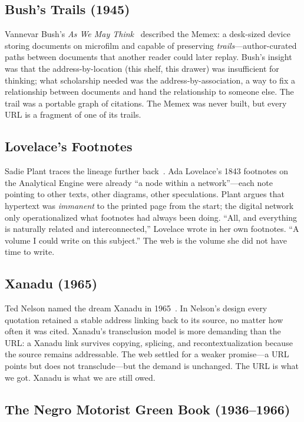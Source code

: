 \documentclass[10pt,letterpaper,twocolumn]{article}
\begin{document}
\subsection{Bush's Trails (1945)}

Vannevar Bush's \emph{As We May Think}~\citep{bush1945memex} described the Memex: a desk-sized device storing documents on microfilm and capable of preserving \emph{trails}---author-curated paths between documents that another reader could later replay. Bush's insight was that the address-by-location (this shelf, this drawer) was insufficient for thinking; what scholarship needed was the address-by-association, a way to fix a relationship between documents and hand the relationship to someone else. The trail was a portable graph of citations. The Memex was never built, but every URL is a fragment of one of its trails.

\subsection{Lovelace's Footnotes}

Sadie Plant traces the lineage further back~\citep{plant1997zerosones}. Ada Lovelace's 1843 footnotes on the Analytical Engine were already ``a node within a network''---each note pointing to other texts, other diagrams, other speculations. Plant argues that hypertext was \emph{immanent} to the printed page from the start; the digital network only operationalized what footnotes had always been doing. ``All, and everything is naturally related and interconnected,'' Lovelace wrote in her own footnotes. ``A volume I could write on this subject.'' The web is the volume she did not have time to write.

\subsection{Xanadu (1965)}

Ted Nelson named the dream Xanadu in 1965~\citep{nelson1965literary, nelson1974computer}. In Nelson's design every quotation retained a stable address linking back to its source, no matter how often it was cited. Xanadu's transclusion model is more demanding than the URL: a Xanadu link survives copying, splicing, and recontextualization because the source remains addressable. The web settled for a weaker promise---a URL points but does not transclude---but the demand is unchanged. The URL is what we got. Xanadu is what we are still owed.

\subsection{The Negro Motorist Green Book (1936--1966)}
\end{document}
